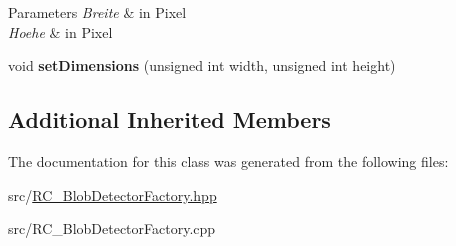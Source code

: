 \begin{DoxyParams}{Parameters}
{\em Breite} & in Pixel \\
\hline
{\em Hoehe} & in Pixel \\
\hline
\end{DoxyParams}
\begin{DoxyCompactItemize}
\item 
\hypertarget{classrc_1_1BlobDetectorFactory_a4bf955ad08f9218729777737b9071e35}{void {\bfseries set\+Dimensions} (unsigned int width, unsigned int height)}\label{classrc_1_1BlobDetectorFactory_a4bf955ad08f9218729777737b9071e35}

\end{DoxyCompactItemize}
\subsection*{Additional Inherited Members}


The documentation for this class was generated from the following files\+:\begin{DoxyCompactItemize}
\item 
src/\hyperlink{RC__BlobDetectorFactory_8hpp}{R\+C\+\_\+\+Blob\+Detector\+Factory.\+hpp}\item 
src/R\+C\+\_\+\+Blob\+Detector\+Factory.\+cpp\end{DoxyCompactItemize}
